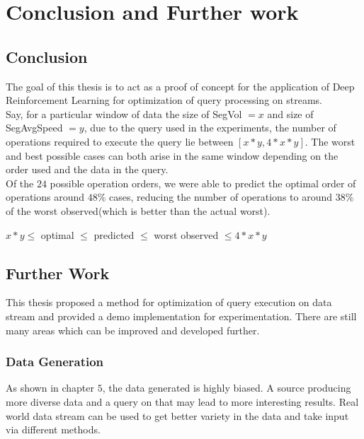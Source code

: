 \chapter{Conclusion and Further work}
\label{chapter:Conclusion_and_further_work}
\thispagestyle{myheadings}

\graphicspath{}

\section{Conclusion}
The goal of this thesis is to act as a proof of concept for the application of Deep Reinforcement Learning for optimization of query processing on streams.\\
Say, for a particular window of data the size of SegVol $=x$ and size of SegAvgSpeed $=y$, due to the query used in the experiments, the number of operations required to execute the query lie between $[x*y,4*x*y]$. The worst and best possible cases can both arise in the same window depending on the order used and the data in the query.\\
Of the $24$ possible operation orders, we were able to predict the optimal order of operations around $48\%$ cases, reducing the number of operations to around $38\%$ of the worst observed(which is better than the actual worst).
\begin{center}
$x*y \leq$ optimal $\leq$ predicted $\leq$ worst observed $\leq 4*x*y$
\end{center}

\section{Further Work}
This thesis proposed a method for optimization of query execution on data stream and provided a demo implementation for experimentation. There are still many areas which can be improved and developed further.

\subsection{Data Generation}
As shown in chapter $5$, the data generated is highly biased. A source producing more diverse data and a query on that may lead to more interesting results. Real world data stream can be used to get better variety in the data and take input via different methods.

